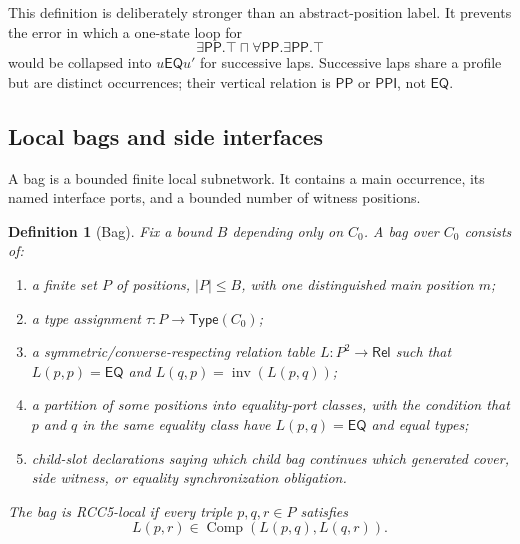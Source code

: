 \documentclass[11pt]{article}
\newtheorem{definition}[theorem]{Definition}
\newcommand{\Rel}{\mathsf{Rel}}
\newcommand{\EQ}{\mathsf{EQ}}
\newcommand{\PP}{\mathsf{PP}}
\newcommand{\PPI}{\mathsf{PPI}}
\newcommand{\Comp}{\operatorname{Comp}}
\newcommand{\Inv}{\operatorname{inv}}
\begin{document}
This definition is deliberately stronger than an abstract-position label.  It prevents the error in which a one-state loop for
\[
  \exists\PP.\top\sqcap\forall\PP.\exists\PP.\top
\]
would be collapsed into $u\EQ u'$ for successive laps.  Successive laps share a profile but are distinct occurrences; their vertical relation is $\PP$ or $\PPI$, not $\EQ$.

\subsection{Local bags and side interfaces}

A bag is a bounded finite local subnetwork.  It contains a main occurrence, its named interface ports, and a bounded number of witness positions.

\begin{definition}[Bag]
Fix a bound $B$ depending only on $C_0$.  A bag over $C_0$ consists of:
\begin{enumerate}[label=(B\arabic*)]
\item a finite set $P$ of positions, $|P|\le B$, with one distinguished main position $m$;
\item a type assignment $\tau:P\to\mathsf{Type}(C_0)$;
\item a symmetric/converse-respecting relation table $L:P^2\to\Rel$ such that $L(p,p)=\EQ$ and $L(q,p)=\Inv(L(p,q))$;
\item a partition of some positions into equality-port classes, with the condition that $p$ and $q$ in the same equality class have $L(p,q)=\EQ$ and equal types;
\item child-slot declarations saying which child bag continues which generated cover, side witness, or equality synchronization obligation.
\end{enumerate}
The bag is RCC5-local if every triple $p,q,r\in P$ satisfies
\[
  L(p,r)\in\Comp(L(p,q),L(q,r)).
\]
\end{definition}
\end{document}
